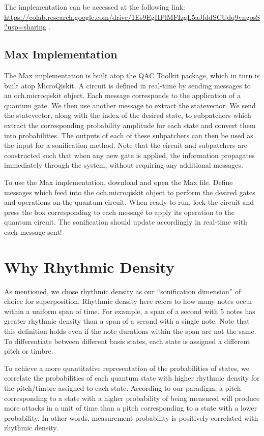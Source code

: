 \documentclass[10pt,twocolumn]{article}
\begin{document}
The implementation can be accessed at the following link: \url{https://colab.research.google.com/drive/1Es9EgHPlMFIzgL5aJfddSCUdq9vngosS?usp=sharing} .

\subsection{Max Implementation}

The Max implementation is built atop the QAC Toolkit\cite{Hamido_2022} package, which in turn is built atop MicroQiskit\cite{microqiskit}. A circuit is defined in real-time by sending messages to an och.microqiskit object. Each message corresponds to the application of a quantum gate. We then use another message to extract the statevector. We send the statevector, along with the index of the desired state, to subpatchers which extract the corresponding probability amplitude for each state and convert them into probabilities. The outputs of each of these subpatchers can then be used as the input for a sonification method. Note that the circuit and subpatchers are constructed such that when any new gate is applied, the information propagates immediately through the system, without requiring any additional messages.

To use the Max implementation, download and open the Max file. Define messages which feed into the och.microqiskit object to perform the desired gates and operations on the quantum circuit. When ready to run, lock the circuit and press the box corresponding to each message to apply its operation to the quantum circuit. The sonification should update accordingly in real-time with each message sent!

\section{Why Rhythmic Density}

As mentioned, we chose rhythmic density as our “sonification dimension” of choice for superposition. Rhythmic density here refers to how many notes occur within a uniform span of time. For example, a span of a second with 5 notes has greater rhythmic density than a span of a second with a single note. Note that this definition holds even if the note durations within the span are not the same. To differentiate between different basis states, each state is assigned a different pitch or timbre.

To achieve a more quantitative representation of the probabilities of states, we correlate the probabilities of each quantum state with higher rhythmic density for the pitch/timbre assigned to each state. According to our paradigm, a pitch corresponding to a state with a higher probability of being measured will produce more attacks in a unit of time than a pitch corresponding to a state with a lower probability. In other words, measurement probability is positively correlated with rhythmic density.
\end{document}
